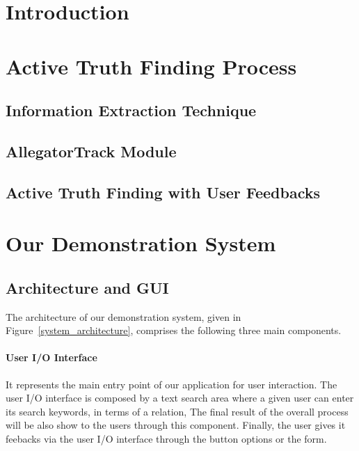 \documentclass{sig-alternate}
\begin{document}


\section{Introduction}

\section{Active Truth Finding Process}

\subsection{Information Extraction Technique}

\subsection{AllegatorTrack Module}

\subsection{Active Truth Finding with User Feedbacks}

\section{Our Demonstration System}

\subsection{Architecture and GUI}
The architecture of our demonstration system, given in
Figure~\ref{system_architecture}, comprises the following
three main components.

\paragraph*{User I/O Interface}It represents the main entry point
of our application for user interaction. The user I/O interface is
composed by a text search area where a given user can enter its 
search keywords, in terms of a relation, The final result of the 
overall process will be also show to the users through this component.
Finally, the user gives it feebacks via the user I/O interface through
the button options or the form.
\end{document}
